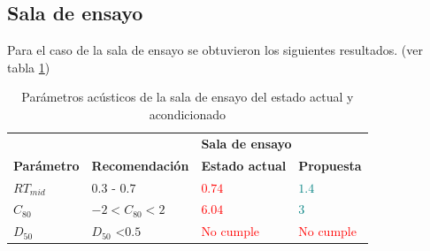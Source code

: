 \begin{table}[H]
    \caption{Parámetros acústicos de las salas de reunión del estado actual y acondicionado}
    \label{tab: resultados salas de reunion}
\end{table}

\subsection{Sala de ensayo}

Para el caso de la sala de ensayo se obtuvieron los siguientes resultados. (ver tabla \ref{tab: resultados sala de ensayo})
\begin{table}[H]
    \centering
    \begin{tabular}{|l|l|ll|}
    \hline
     &  & \multicolumn{2}{l|}{\textbf{Sala de ensayo}} \\ \cline{3-4} 
    \multirow{-2}{*}{\textbf{Parámetro}} & \multirow{-2}{*}{\textbf{Recomendación}} & \multicolumn{1}{l|}{\textbf{Estado actual}} & \textbf{Propuesta} \\ \hline
    $RT_{mid}$ & $0.3$ - $0.7$ & \multicolumn{1}{l|}{\textcolor{red}{$0.74$}} & \textcolor{teal}{$1.4$} \\ \hline
    $C_{80}$ & $-2<C_{80}<2$ & \multicolumn{1}{l|}{\textcolor{red}{$6.04$}} & \textcolor{teal}{$3$} \\ \hline
    $D_{50}$ & $D_{50}$ \textless $0.5$ & \multicolumn{1}{l|}{\textcolor{red}{No cumple}} & \textcolor{red}{No cumple} \\ \hline
    \end{tabular}
    \caption{Parámetros acústicos de la sala de ensayo del estado actual y acondicionado}
    \label{tab: resultados sala de ensayo}
\end{table}